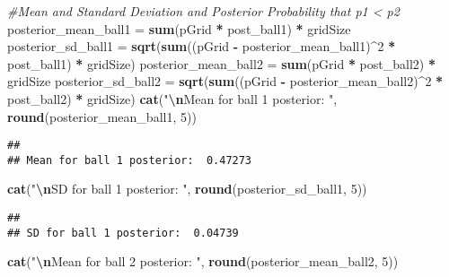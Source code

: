 \documentclass[
]{article}
\newenvironment{Shaded}{\begin{snugshade}}{\end{snugshade}}
\newcommand{\CommentTok}[1]{\textcolor[rgb]{0.56,0.35,0.01}{\textit{#1}}}
\newcommand{\DecValTok}[1]{\textcolor[rgb]{0.00,0.00,0.81}{#1}}
\newcommand{\FunctionTok}[1]{\textcolor[rgb]{0.13,0.29,0.53}{\textbf{#1}}}
\newcommand{\NormalTok}[1]{#1}
\newcommand{\OtherTok}[1]{\textcolor[rgb]{0.56,0.35,0.01}{#1}}
\newcommand{\SpecialCharTok}[1]{\textcolor[rgb]{0.81,0.36,0.00}{\textbf{#1}}}
\newcommand{\StringTok}[1]{\textcolor[rgb]{0.31,0.60,0.02}{#1}}
\begin{document}
\begin{Shaded}
\begin{Highlighting}[]
\CommentTok{\#Mean and Standard Deviation and Posterior Probability that p1 \textless{} p2}
\NormalTok{posterior\_mean\_ball1 }\OtherTok{=} \FunctionTok{sum}\NormalTok{(pGrid }\SpecialCharTok{*}\NormalTok{ post\_ball1) }\SpecialCharTok{*}\NormalTok{ gridSize}
\NormalTok{posterior\_sd\_ball1 }\OtherTok{=} 
  \FunctionTok{sqrt}\NormalTok{(}\FunctionTok{sum}\NormalTok{((pGrid }\SpecialCharTok{{-}}\NormalTok{ posterior\_mean\_ball1)}\SpecialCharTok{\^{}}\DecValTok{2} \SpecialCharTok{*}\NormalTok{ post\_ball1) }\SpecialCharTok{*}\NormalTok{ gridSize)}
\NormalTok{posterior\_mean\_ball2 }\OtherTok{=} \FunctionTok{sum}\NormalTok{(pGrid }\SpecialCharTok{*}\NormalTok{ post\_ball2) }\SpecialCharTok{*}\NormalTok{ gridSize}
\NormalTok{posterior\_sd\_ball2 }\OtherTok{=}  
  \FunctionTok{sqrt}\NormalTok{(}\FunctionTok{sum}\NormalTok{((pGrid }\SpecialCharTok{{-}}\NormalTok{ posterior\_mean\_ball2)}\SpecialCharTok{\^{}}\DecValTok{2} \SpecialCharTok{*}\NormalTok{ post\_ball2) }\SpecialCharTok{*}\NormalTok{ gridSize)}
\FunctionTok{cat}\NormalTok{(}\StringTok{"}\SpecialCharTok{\textbackslash{}n}\StringTok{Mean for ball 1 posterior: "}\NormalTok{, }\FunctionTok{round}\NormalTok{(posterior\_mean\_ball1, }\DecValTok{5}\NormalTok{))}
\end{Highlighting}
\end{Shaded}

\begin{verbatim}
## 
## Mean for ball 1 posterior:  0.47273
\end{verbatim}

\begin{Shaded}
\begin{Highlighting}[]
\FunctionTok{cat}\NormalTok{(}\StringTok{"}\SpecialCharTok{\textbackslash{}n}\StringTok{SD for ball 1 posterior: "}\NormalTok{, }\FunctionTok{round}\NormalTok{(posterior\_sd\_ball1, }\DecValTok{5}\NormalTok{))}
\end{Highlighting}
\end{Shaded}

\begin{verbatim}
## 
## SD for ball 1 posterior:  0.04739
\end{verbatim}

\begin{Shaded}
\begin{Highlighting}[]
\FunctionTok{cat}\NormalTok{(}\StringTok{"}\SpecialCharTok{\textbackslash{}n}\StringTok{Mean for ball 2 posterior: "}\NormalTok{, }\FunctionTok{round}\NormalTok{(posterior\_mean\_ball2, }\DecValTok{5}\NormalTok{))}
\end{Highlighting}
\end{Shaded}
\end{document}
